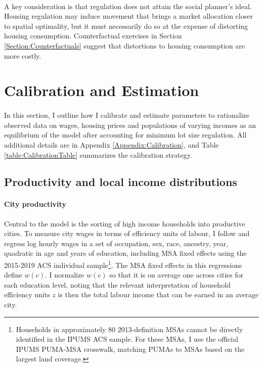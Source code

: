 \documentclass[12pt]{article}
\begin{document}
\paragraph*{}
A key consideration is that regulation does not attain the social planner's ideal. Housing regulation may induce movement that brings a market allocation closer to spatial optimality, but it must necessarily do so at the expense of distorting housing consumption. Counterfactual exercises in Section \ref{Section:Counterfactuals} suggest that distortions to housing consumption  are more costly.



\section{Calibration and Estimation}\label{Section:CalibrationEstimation}

\paragraph{}
In this section, I outline how I calibrate and estimate parameters to rationalize observed data on wages, housing prices and populations of varying incomes as an equilibrium of the model after accounting for minimum lot size regulation. All additional details are in Appendix \ref{Appendix:Calibration}, and Table \ref{table:CalibrationTable} summarizes the calibration strategy.

\subsection{Productivity and local income distributions}

\paragraph*{City productivity}\label{Calibration:CityProd} Central to the model is the sorting of high income households into productive cities. To measure city wages in terms of efficiency units of labour, I follow \cite{ineqincreased} and regress log hourly wages in a set of occupation, sex, race, ancestry, year, quadratic in age and years of education, including MSA fixed effects using the 2015-2019 ACS individual sample\footnote{Households in approximately 80 2013-definition MSAs cannot be directly identified in the IPUMS ACS sample. For these MSAs, I use the official IPUMS PUMA-MSA crosswalk, matching PUMAs to MSAs based on the largest land coverage.}. The MSA fixed effects in this regressions define $w(c)$. I normalize $w(c)$ so that it is on average one across cities for each education level, noting that the relevant interpretation of household efficiency units $z$ is then the total labour income that can be earned in an average city. 
\end{document}
